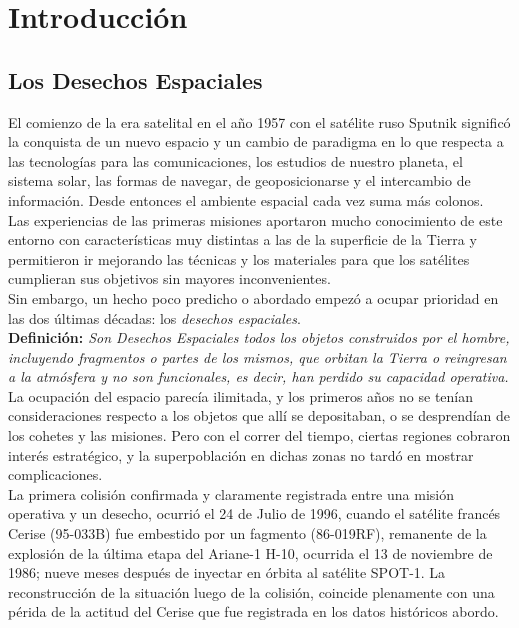 \chapter{Introducción}
\label{chap:introduccion}


\section{Los Desechos Espaciales}

El comienzo de la era satelital en el a\~no 1957 con el sat\'elite ruso Sputnik signific\'o la conquista de un nuevo espacio y un cambio de paradigma en lo que respecta a las tecnolog\'ias para las comunicaciones, los estudios de nuestro planeta, el sistema solar, las formas de navegar, de geoposicionarse y el intercambio de informaci\'on. Desde entonces el ambiente espacial cada vez suma m\'as colonos.\\

Las experiencias de las primeras misiones aportaron mucho conocimiento de este entorno con caracter\'isticas muy distintas a las de la superficie de la Tierra y permitieron ir mejorando las t\'ecnicas y los materiales para que los sat\'elites cumplieran sus objetivos sin mayores inconvenientes.\\
Sin embargo, un hecho poco predicho o abordado empez\'o a ocupar prioridad en las dos \'ultimas d\'ecadas: los {\it{desechos espaciales}}.\\

{\bf{Definici\'on:}}{\it{ Son Desechos Espaciales todos los objetos construidos por el hombre, incluyendo fragmentos o partes de los mismos, que orbitan la Tierra o reingresan a la atm\'osfera y no son funcionales, es decir, han perdido su capacidad operativa.}} \citep{iadcguide}\\

La ocupaci\'on del espacio parec\'ia ilimitada, y los primeros a\~nos no se ten\'ian consideraciones respecto a los objetos que all\'i se depositaban, o se desprend\'ian de los cohetes y las misiones. Pero con el correr del tiempo, ciertas regiones cobraron inter\' es estrat\'egico, y la superpoblaci\' on en dichas zonas no tard\'o en mostrar complicaciones.\\

La primera colisi\'on confirmada y claramente registrada entre una misi\'on operativa y un desecho, ocurri\'o el 24 de Julio de 1996, cuando el sat\'elite franc\'es Cerise (95-033B) fue embestido por un fagmento (86-019RF), remanente de la explosi\'on de la \'ultima etapa del Ariane-1 H-10, ocurrida el 13 de noviembre de 1986; nueve meses despu\'es de inyectar en \'orbita al sat\'elite SPOT-1. La reconstrucci\'on de la situaci\'on luego de la colisi\'on, coincide plenamente con una p\'erida de la actitud del Cerise que fue registrada en los datos hist\'oricos abordo. \citep{KlinkradChapter8}\\

